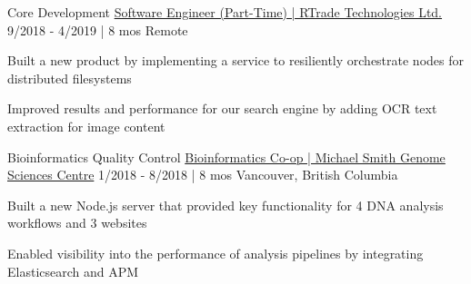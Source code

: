 \begin{cventries}
  \cventry
    {Core Development} %
    {\href{https://bobheadxi.dev/experience/rtrade}{Software Engineer (Part-Time) | RTrade Technologies Ltd.}} %
    {9/2018 - 4/2019 | 8 mos} %
    {Remote} %
    {
      \begin{cvitems} %
        \item {Built a new product by implementing a service to resiliently orchestrate nodes for distributed filesystems}
        \item {Improved results and performance for our search engine by adding OCR text extraction for image content}
      \end{cvitems}
    }

  \cventry
    {Bioinformatics Quality Control} %
    {\href{https://bobheadxi.dev/experience/bcgsc}{Bioinformatics Co-op | Michael Smith Genome Sciences Centre}} %
    {1/2018 - 8/2018 | 8 mos} %
    {Vancouver, British Columbia} %
    {
      \begin{cvitems} %
        \item {Built a new Node.js server that provided key functionality for 4 DNA analysis workflows and 3 websites}
        \item {Enabled visibility into the performance of analysis pipelines by integrating Elasticsearch and APM}
      \end{cvitems}
    }

\end{cventries}
